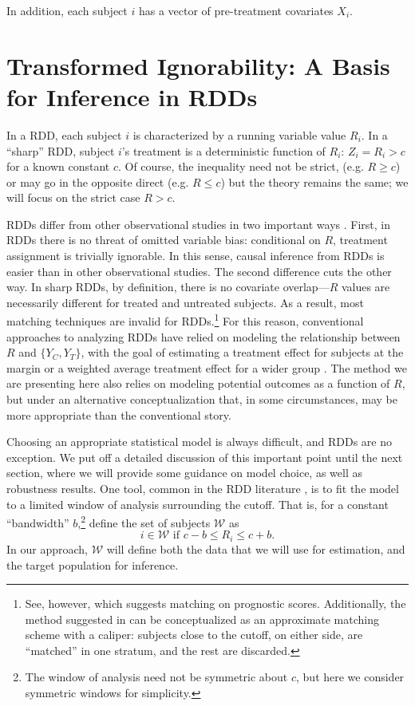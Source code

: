 \documentclass[12pt]{article}
\begin{document}
In addition, each subject $i$ has a vector of pre-treatment covariates $X_i$.


\section{Transformed Ignorability: A Basis for Inference in RDDs}
In a RDD, each subject $i$ is characterized by a running variable
value $R_i$.
In a ``sharp'' RDD, subject $i$'s treatment is a deterministic function of $R_i$:
$Z_i=R_i>c$ for a known constant $c$.
Of course, the inequality need not be strict, (e.g. $R\ge c$) or may
go in the opposite direct (e.g. $R\le c$) but the theory remains the
same; we will focus on the strict case $R>c$.

RDDs differ from other observational studies in two important ways
\citep[See][p. 10]{angrist2012wanna}.
First, in RDDs there is no threat of omitted variable bias:
conditional on $R$, treatment assignment is trivially ignorable.
In this sense, causal inference from RDDs is easier than in other
observational studies.
The second difference cuts the other way.
In sharp RDDs, by definition, there is no covariate overlap---$R$
values are necessarily different for treated and untreated subjects.
As a result, most matching techniques are invalid for
RDDs.\footnote{See, however, \citet{hansen:2008biometrika} which
  suggests matching on prognostic scores. Additionally, the method
  suggested in \citet{rocio} can be conceptualized as an approximate
  matching scheme with a caliper: subjects close to the cutoff, on
  either side, are ``matched'' in one stratum, and the rest are
  discarded.}
For this reason, conventional approaches to analyzing RDDs have relied
on modeling the relationship between $R$ and $\{Y_C,Y_T\}$, with the
goal of estimating a treatment effect for subjects at the margin
\citep{imbens2008regression,angrist2009mostly} or a weighted average
treatment effect for a wider group \citep{lee:2005}.
The method we are presenting here also relies on modeling potential
outcomes as a function of $R$, but under an alternative
conceptualization that, in some circumstances, may be more appropriate
than the conventional story.

Choosing an appropriate statistical model is always difficult, and RDDs are no exception.
We put off a detailed discussion of this important point until the
next section, where we will provide some guidance on model choice, as
well as robustness results.
One tool, common in the RDD literature
\citep{imbens2008regression,desjardins2008impact,imbens2012optimal,rocio},
is to fit the model to a limited window of analysis surrounding the
cutoff.
That is, for a constant ``bandwidth'' $b$,\footnote{The window of
  analysis need not be symmetric about $c$, but here we consider
  symmetric windows for simplicity.} define the set of subjects
$\mathcal{W}$ as
\begin{equation}
i\in \mathcal{W} \text{ if } c-b\le R_i \le c+b.
\end{equation}
In our approach, $\mathcal{W}$ will define both the data that we will
use for estimation, and the target population for inference.
\end{document}
